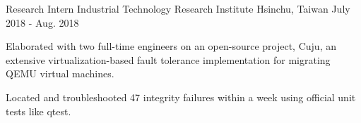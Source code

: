 
\vspace{-2mm}

\begin{cventries}

  \cventry
    {Research Intern} %
    {Industrial Technology Research Institute} %
    {Hsinchu, Taiwan} %
    {July 2018 - Aug. 2018} %
    {
      \begin{cvitems} %
        \item {Elaborated with two full-time engineers on an open-source project, Cuju, an extensive virtualization-based fault tolerance implementation for migrating
        QEMU virtual machines.
        }
        \item {Located and troubleshooted 47 integrity failures within a week using official unit tests like qtest.
        }
      \end{cvitems}
    }

    \vspace{-2mm}


\end{cventries}
